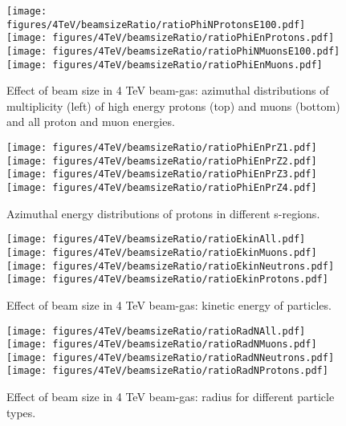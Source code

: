 \begin{figure}%
\begin{center}
  \texttt{[image: figures/4TeV/beamsizeRatio/ratioPhiNProtonsE100.pdf]}
  \texttt{[image: figures/4TeV/beamsizeRatio/ratioPhiEnProtons.pdf]}
  \texttt{[image: figures/4TeV/beamsizeRatio/ratioPhiNMuonsE100.pdf]}
  \texttt{[image: figures/4TeV/beamsizeRatio/ratioPhiEnMuons.pdf]}
\end{center}
\vspace{-0.6cm}
 \caption{Effect of beam size in 4 TeV beam-gas: azimuthal distributions of multiplicity (left) of high energy protons (top) and muons (bottom) and all proton and muon energies. 
  \label{bsRatioPhiMP}}
\end{figure}

\begin{figure}%
\begin{center}
  \texttt{[image: figures/4TeV/beamsizeRatio/ratioPhiEnPrZ1.pdf]}
  \texttt{[image: figures/4TeV/beamsizeRatio/ratioPhiEnPrZ2.pdf]}
  \texttt{[image: figures/4TeV/beamsizeRatio/ratioPhiEnPrZ3.pdf]}
  \texttt{[image: figures/4TeV/beamsizeRatio/ratioPhiEnPrZ4.pdf]}
\end{center}
\vspace{-0.6cm}
 \caption{Azimuthal energy distributions of protons in different s-regions.
  \label{bsZPr}}
\end{figure}

\begin{figure}%
\begin{center}
  \texttt{[image: figures/4TeV/beamsizeRatio/ratioEkinAll.pdf]}
  \texttt{[image: figures/4TeV/beamsizeRatio/ratioEkinMuons.pdf]}
  \texttt{[image: figures/4TeV/beamsizeRatio/ratioEkinNeutrons.pdf]}
  \texttt{[image: figures/4TeV/beamsizeRatio/ratioEkinProtons.pdf]}
\end{center}
\vspace{-0.6cm}
 \caption{Effect of beam size in 4 TeV beam-gas: kinetic energy of particles.
  \label{bsRatioEkin}}
\end{figure}

\begin{figure}%
\begin{center}
  \texttt{[image: figures/4TeV/beamsizeRatio/ratioRadNAll.pdf]}
  \texttt{[image: figures/4TeV/beamsizeRatio/ratioRadNMuons.pdf]}
  \texttt{[image: figures/4TeV/beamsizeRatio/ratioRadNNeutrons.pdf]}
  \texttt{[image: figures/4TeV/beamsizeRatio/ratioRadNProtons.pdf]}
\end{center}
\vspace{-0.6cm}
 \caption{Effect of beam size in 4 TeV beam-gas: radius for different particle types.
  \label{bsRatioRadN}}
\end{figure}

